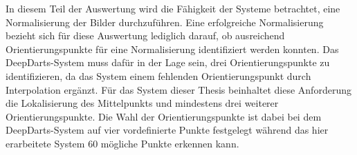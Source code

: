 


In diesem Teil der Auswertung wird die Fähigkeit der Systeme betrachtet, eine Normalisierung der Bilder durchzuführen. Eine erfolgreiche Normalisierung bezieht sich für diese Auswertung lediglich darauf, ob ausreichend Orientierungspunkte für eine Normalisierung identifiziert werden konnten. Das DeepDarts-System muss dafür in der Lage sein, drei Orientierungspunkte zu identifizieren, da das System einem fehlenden Orientierungspunkt durch Interpolation ergänzt. Für das System dieser Thesis beinhaltet diese Anforderung die Lokalisierung des Mittelpunkts und mindestens drei weiterer Orientierungspunkte. Die Wahl der Orientierungspunkte ist dabei bei dem DeepDarts-System auf vier vordefinierte Punkte festgelegt während das hier erarbeitete System 60 mögliche Punkte erkennen kann.

